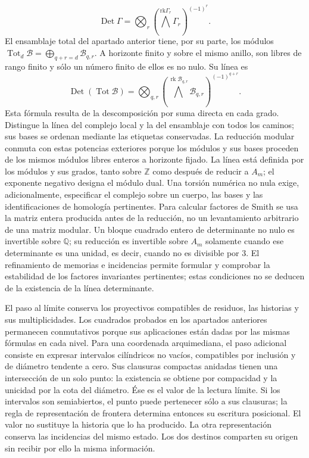 \[
\operatorname{Det}\Gamma=
\bigotimes_r\left(\bigwedge^{\mathrm{rk}\Gamma_r}\Gamma_r\right)^{(-1)^r}.
\]
El ensamblaje total del apartado anterior tiene, por su parte, los módulos \(\operatorname{Tot}_d\mathcal B=\bigoplus_{q+r=d}\mathcal B_{q,r}\). A horizonte finito y sobre el mismo anillo, son libres de rango finito y sólo un número finito de ellos es no nulo. Su línea es
\[
\operatorname{Det}(\operatorname{Tot}\mathcal B)=
\bigotimes_{q,r}
\left(\bigwedge^{\operatorname{rk}\mathcal B_{q,r}}
\mathcal B_{q,r}\right)^{(-1)^{q+r}}.
\]
Esta fórmula resulta de la descomposición por suma directa en cada grado. Distingue la línea del complejo local y la del ensamblaje con todos los caminos; sus bases se ordenan mediante las etiquetas conservadas. La reducción modular conmuta con estas potencias exteriores porque los módulos y sus bases proceden de los mismos módulos libres enteros a horizonte fijado.
La línea está definida por los módulos y sus grados, tanto sobre \(\mathbb Z\) como después de reducir a \(A_m\); el exponente negativo designa el módulo dual. Una torsión numérica no nula exige, adicionalmente, especificar el complejo sobre un cuerpo, las bases y las identificaciones de homología pertinentes. Para calcular factores de Smith se usa la matriz entera producida antes de la reducción, no un levantamiento arbitrario de una matriz modular. Un bloque cuadrado entero de determinante no nulo es invertible sobre \(\mathbb Q\); su reducción es invertible sobre \(A_m\) solamente cuando ese determinante es una unidad, es decir, cuando no es divisible por \(3\). El refinamiento de memorias e incidencias permite formular y comprobar la estabilidad de los factores invariantes pertinentes; estas condiciones no se deducen de la existencia de la línea determinante.

El paso al límite conserva los proyectivos compatibles de residuos, las historias y sus multiplicidades. Los cuadrados probados en los apartados anteriores permanecen conmutativos porque sus aplicaciones están dadas por las mismas fórmulas en cada nivel. Para una coordenada arquimediana, el paso adicional consiste en expresar intervalos cilíndricos no vacíos, compatibles por inclusión y de diámetro tendente a cero. Sus clausuras compactas anidadas tienen una intersección de un solo punto: la existencia se obtiene por compacidad y la unicidad por la cota del diámetro. Ése es el valor de la lectura límite. Si los intervalos son semiabiertos, el punto puede pertenecer sólo a sus clausuras; la regla de representación de frontera determina entonces su escritura posicional. El valor no sustituye la historia que lo ha producido. La otra representación conserva las incidencias del mismo estado. Los dos destinos comparten su origen sin recibir por ello la misma información.

